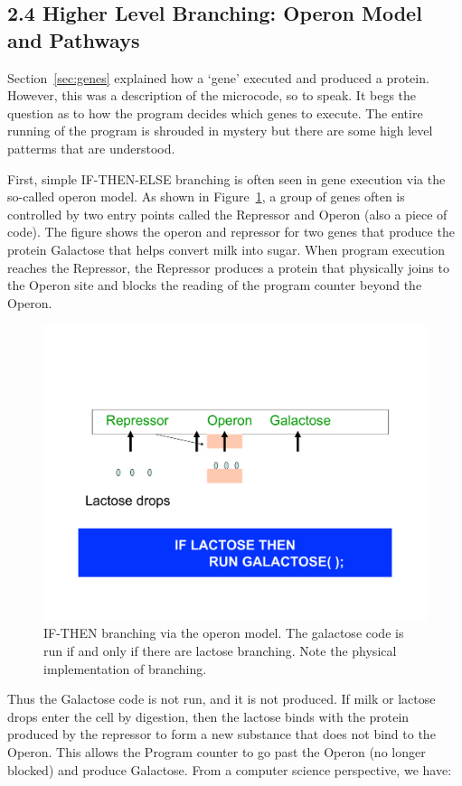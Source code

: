 \documentclass[10pt,fullpage]{article}
\begin{document}
\subsection{2.4 Higher Level Branching: Operon Model and Pathways}
\label{sec:pathways}
Section~\ref{sec:genes} explained how a `gene' executed and produced a
protein.  However, this was a description of the microcode, so to
speak.  It begs the question as to how the program decides which genes
to execute.  The entire running of the program is shrouded in mystery
but there are some high level patterms that are understood.

First, simple IF-THEN-ELSE branching is often seen in gene execution
via the so-called operon model. As shown in
Figure~\ref{fig:branching}, a group of genes often is controlled by
two entry points called the Repressor and Operon (also a piece of
code).  The figure shows the operon and repressor for two genes that
produce the protein Galactose that helps convert milk into sugar.
When program execution reaches the Repressor, the Repressor produces a
protein that physically joins to the Operon site and blocks the
reading of the program counter beyond the Operon.



\begin{figure}[h!]
  \centering
  \includegraphics[trim = 20mm 20mm 20mm 30mm, clip, width=4.5in]{fig/branching.pdf}
  \caption{IF-THEN branching via the operon model.  The
    galactose code is run if and only if there are lactose branching.
    Note the physical implementation of branching.}
  \label{fig:branching}
\end{figure}

Thus the Galactose code is not run, and it is not produced.  If milk
or lactose drops enter the cell by digestion, then the lactose binds
with the protein produced by the repressor to form a new substance
that does not bind to the Operon.  This allows the Program counter to
go past the Operon (no longer blocked) and produce Galactose.  From a
computer science perspective, we have:
\end{document}

